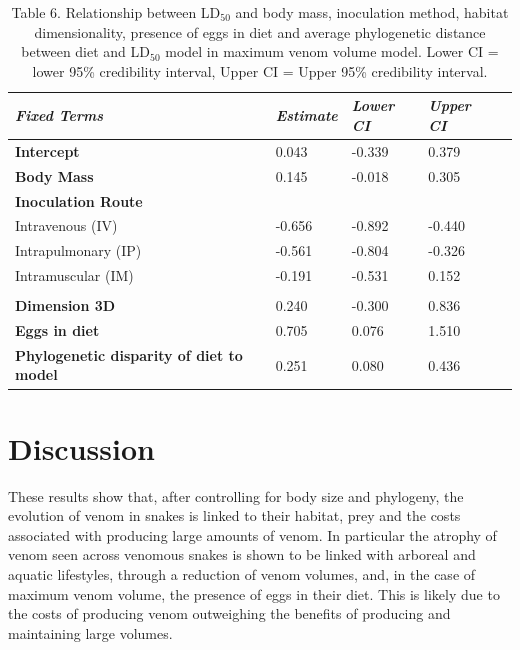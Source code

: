 \begin{table}[H]
  \centering
    \caption[ ]{Table 6. Relationship between LD$_{50}$ and body mass, inoculation method, habitat dimensionality, presence of eggs in diet and average phylogenetic distance between diet and LD$_{50}$ model in maximum venom volume model. Lower CI = lower 95\% credibility interval, Upper CI = Upper 95\% credibility interval.}
\begin{tabular}{*5l}    \toprule
\emph{Fixed Terms} & \emph{Estimate} & \emph{Lower CI} & \emph{Upper CI}\\\midrule
\textbf{Intercept} & 0.043  &  -0.339 & 0.379 \\ 
\textbf{Body Mass} & 0.145  &  -0.018 & 0.305 \\ 
\textbf{Inoculation Route} &  &  &  \\ 
 Intravenous (IV) &  -0.656 &  -0.892 &  -0.440 \\
 Intrapulmonary (IP) &  -0.561 &  -0.804 &  -0.326 \\ 
 Intramuscular (IM) &  -0.191 &  -0.531 & 0.152 \\
  &  &  &  \\ 
\textbf{Dimension 3D} & 0.240 &  -0.300 & 0.836 \\ 
\textbf{Eggs in diet} & 0.705 & 0.076 & 1.510 \\ 
\textbf{Phylogenetic disparity of diet to model} & 0.251 & 0.080 & 0.436 \\\bottomrule
 \hline
\end{tabular}
  \label{tbl:Table 6.}
\end{table}




\section{Discussion}


These results show that, after controlling for body size and phylogeny, the evolution of venom in snakes is linked to their habitat, prey and the costs associated with producing large amounts of venom. In particular the atrophy of venom seen across venomous snakes is shown to be linked with arboreal and aquatic lifestyles, through a reduction of venom volumes,  and, in the case of maximum venom volume, the presence of eggs in their diet. This is likely due to the costs of producing venom \citep{pintor2010costs} outweighing the benefits of producing and maintaining large volumes. 


